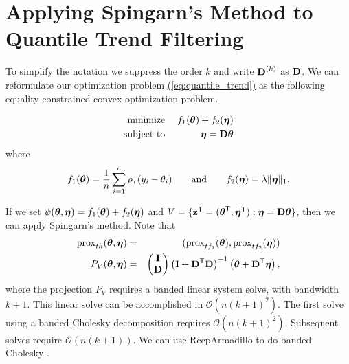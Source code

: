 \documentclass{article}
\newcommand{\Eqn}[1]{\hyperref[eq:#1]{{\rm (\ref*{eq:#1})}}} %
\newcommand{\Eqn}[1]{{(\ref{eq:#1})}} %
\newcommand{\Tra}{^{\sf T}} %
\newcommand{\Inv}{^{-1}} %
\newcommand{\V}[1]{{\bm{\mathbf{\MakeLowercase{#1}}}}} %
\newcommand{\VE}[2]{\MakeLowercase{#1}_{#2}} %
\newcommand{\M}[1]{{\bm{\mathbf{\MakeUppercase{#1}}}}} %
\newcommand{\Mn}[2]{\M{#1}^{(#2)}} %
\newcommand{\prox}[2]{\operatorname{prox}_{#1}({#2})}
\begin{document}
\section{Applying Spingarn's Method to Quantile Trend Filtering}

To simplify the notation we suppress the order $k$ and write $\Mn{D}{k}$ as $\M{D}$.
We can reformulate our optimization problem \Eqn{quantile_trend} as the following equality constrained convex optimization problem.

\begin{eqnarray*}
\text{minimize}\; && f_1(\V{\theta}) + f_2(\V{\eta}) \\
\text{subject to}\; && \V{\eta} = \M{D}\V{\theta}
\end{eqnarray*}
where
\begin{eqnarray*}
f_1(\V{\theta}) = \frac{1}{n}\sum_{i=1}^n \rho_\tau(\VE{y}{i} - \VE{\theta}{i}) \quad\quad \text{and} \quad\quad
f_2(\V{\eta}) = \lambda\lVert \V{\eta} \rVert_1.
\end{eqnarray*}

If we set $\psi(\V{\theta}, \V{\eta}) = f_1(\V{\theta}) + f_2(\V{\eta})$ and $V = \{ \V{z}\Tra = (\V{\theta}\Tra, \V{\eta}\Tra) : \V{\eta} = \M{D}\V{\theta} \}$, then we can apply Spingarn's method. Note that
\begin{eqnarray*}
\prox{th}{\V{\theta}, \V{\eta}} & = & (\prox{tf_1}{\V{\theta}}, \prox{tf_2}{\V{\eta}}) \\
P_V(\V{\theta}, \V{\eta}) & = & \begin{pmatrix}
\M{I} \\ \M{D}
\end{pmatrix}
\begin{pmatrix}
\M{I} + \M{D}\Tra\M{D}
\end{pmatrix}\Inv
\begin{pmatrix}
\V{\theta} + \M{D}\Tra\V{\eta}
\end{pmatrix},
\end{eqnarray*}
where the projection $P_V$ requires a banded linear system solve, with bandwidth $k + 1$.
This linear solve can be accomplished in $\mathcal{O}(n(k + 1)^2)$. The first solve using a banded Cholesky decomposition requires $\mathcal{O}(n(k + 1)^2)$. Subsequent solves require
$\mathcal{O}(n(k+1))$. We can use RccpArmadillo to do banded Cholesky \cite{Eddelbuettel2014}.
\end{document}
